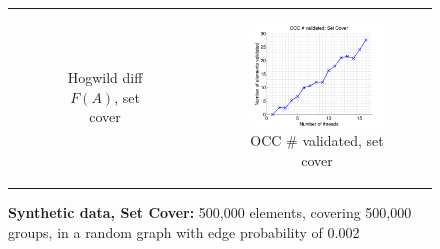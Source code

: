 \documentclass{article} %
\begin{document}
\begin{figure}[ht]
\begin{tabular}{cc}
\begin{subfigure}[b]{0.5\textwidth}
			\caption{Hogwild diff $F(A)$, set cover}
			\label{fig:hogdiffFA_setcover}
	  \end{subfigure} &
	  \begin{subfigure}[b]{0.5\textwidth}
	  	\includegraphics[width=200pt]{images/validated_OCC_setcover_500000.png}
			\caption{OCC \# validated, set cover}
			\label{fig:occsvalidated_setcover}
	  \end{subfigure} \\
	\end{tabular}
	\caption{\textbf{Synthetic data, Set Cover:} 500,000 elements, covering 500,000 groups, in a random graph with edge probability of 0.002}
\end{figure}
\end{document}

